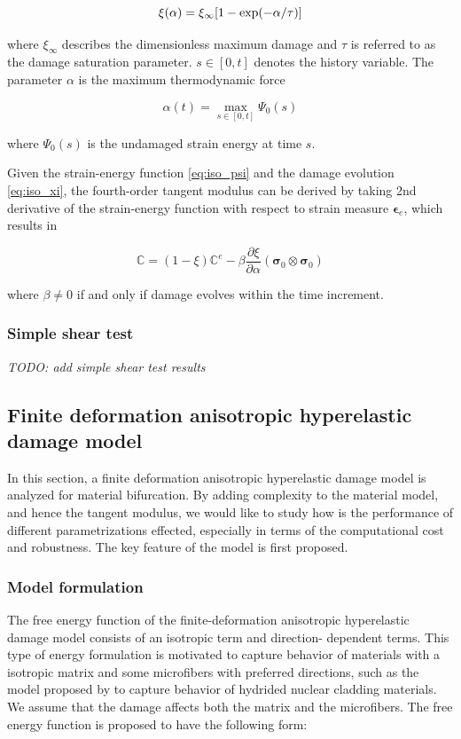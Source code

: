 \documentclass[12pt]{article}
\newcommand{\mbs}[1]{\boldsymbol{#1}}
\def\bepsilon{{\mbs{\epsilon}}}
\newcommand{\tensor}[1]{\ensuremath{\boldsymbol{#1}}}
\numberwithin{equation}{section}
\begin{document}
\begin{equation}\label{eq:iso_xi}
  \xi(\alpha) = \xi_{\infty} [ 1- {\rm exp}(-\alpha / \tau)]
\end{equation}

where $\xi_{\infty}$ describes the dimensionless maximum damage and
$\tau$ is referred to as the damage saturation parameter. $s \in
[0,t]$ denotes the history variable. The parameter $\alpha$ is the
maximum thermodynamic force \cite{Holzapfel:2000}

\begin{equation}
  \alpha(t) = \max_{s\in [0,t]}\Psi_0(s)
\end{equation}

where $\Psi_0(s)$ is the undamaged strain energy at time $s$.

Given the strain-energy function \eqref{eq:iso_psi} and the damage
evolution \eqref{eq:iso_xi}, the fourth-order tangent modulus can be
derived by taking 2nd derivative of the strain-energy function with
respect to strain measure $\bepsilon_e$, which results in

\begin{equation}
  \mathbb{C} = (1-\xi)\mathbb{C}^e 
    - \beta \frac{\partial\xi}{\partial\alpha}
    (\tensor\sigma_0\otimes\tensor\sigma_0)
\end{equation}

where $\beta \neq 0$ if and only if damage evolves within the time
increment.

\subsubsection{Simple shear test}

\textit{TODO: add simple shear test results}

\subsection{Finite deformation anisotropic hyperelastic damage model}\label{subsec:anisotropic}

In this section, a finite deformation anisotropic hyperelastic damage 
model is analyzed for material bifurcation. By adding complexity to 
the material model, and hence the tangent modulus, we would like to 
study how is the performance of different parametrizations effected, 
especially in terms of the computational cost and robustness. The key 
feature of the model is first proposed.

\subsubsection{Model formulation}
The free energy function of the finite-deformation anisotropic 
hyperelastic damage model consists of an isotropic term and direction-
dependent terms. This type of energy formulation is motivated to 
capture behavior of materials with a isotropic matrix and some 
microfibers with preferred directions, such as the model proposed by
\cite{Chen.etal:2014} to capture behavior of hydrided nuclear cladding 
materials. We assume that the damage affects both the matrix and the 
microfibers. The free energy function is proposed to have the 
following form:
\end{document}
